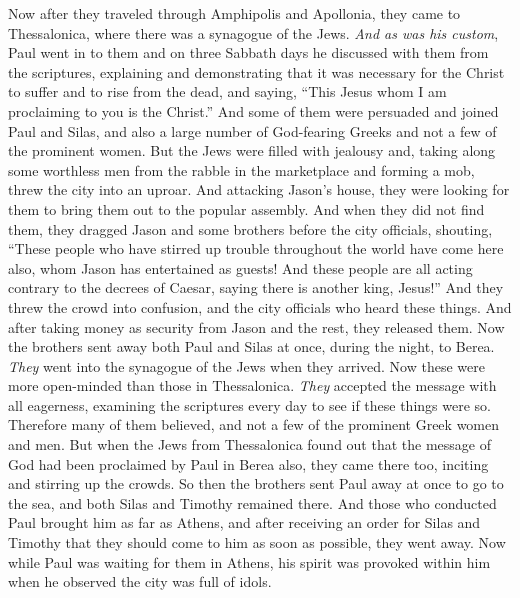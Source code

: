 \begin{biblechapter} %
 Now after they traveled through Amphipolis and Apollonia, they came to Thessalonica, where there was a synagogue of the Jews.
\verse \textit{And as was his custom}, Paul went in to them and on three Sabbath days he discussed with them from the scriptures,
\verse explaining and demonstrating that it was necessary for the Christ to suffer and to rise from the dead, and saying, “This Jesus whom I am proclaiming to you is the Christ.”
\verse And some of them were persuaded and joined Paul and Silas, and also a large number of God-fearing Greeks and not a few of the prominent women.
\verse But the Jews were filled with jealousy and, taking along some worthless men from the rabble in the marketplace and forming a mob, threw the city into an uproar. And attacking Jason’s house, they were looking for them to bring them out to the popular assembly.
\verse And when they did not find them, they dragged Jason and some brothers before the city officials, shouting, “These people who have stirred up trouble throughout the world have come here also,
\verse whom Jason has entertained as guests! And these people are all acting contrary to the decrees of Caesar, saying there is another king, Jesus!”
\verse And they threw the crowd into confusion, and the city officials who heard these things.
\verse And after taking money as security from Jason and the rest, they released them.
 Now the brothers sent away both Paul and Silas at once, during the night, to Berea. \textit{They} went into the synagogue of the Jews when they arrived.
\verse Now these were more open-minded than those in Thessalonica. \textit{They} accepted the message with all eagerness, examining the scriptures every day to see if these things were so.
\verse Therefore many of them believed, and not a few of the prominent Greek women and men.
\verse But when the Jews from Thessalonica found out that the message of God had been proclaimed by Paul in Berea also, they came there too, inciting and stirring up the crowds.
\verse So then the brothers sent Paul away at once to go to the sea, and both Silas and Timothy remained there.
\verse And those who conducted Paul brought him as far as Athens, and after receiving an order for Silas and Timothy that they should come to him as soon as possible, they went away.
 Now while Paul was waiting for them in Athens, his spirit was provoked within him when he observed the city was full of idols.

\end{biblechapter}

